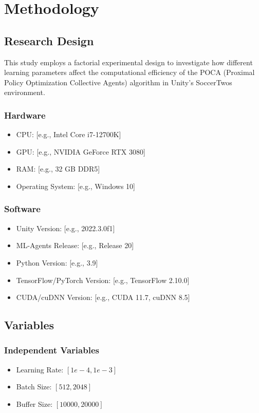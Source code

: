 \section{Methodology}

\subsection{Research Design}
This study employs a factorial experimental design to investigate how different learning parameters affect the computational efficiency of the POCA (Proximal Policy Optimization Collective Agents) algorithm in Unity's SoccerTwos environment.

\subsubsection{Hardware}
\begin{itemize}
    \item CPU: [e.g., Intel Core i7-12700K]
    \item GPU: [e.g., NVIDIA GeForce RTX 3080]
    \item RAM: [e.g., 32 GB DDR5]
    \item Operating System: [e.g., Windows 10]
\end{itemize}

\subsubsection{Software}
\begin{itemize}
    \item Unity Version: [e.g., 2022.3.0f1]
    \item ML-Agents Release: [e.g., Release 20]
    \item Python Version: [e.g., 3.9]
    \item TensorFlow/PyTorch Version: [e.g., TensorFlow 2.10.0]
    \item CUDA/cuDNN Version: [e.g., CUDA 11.7, cuDNN 8.5]
\end{itemize}

\subsection{Variables}
\subsubsection{Independent Variables}
\begin{itemize}
\item Learning Rate: $[1e-4, 1e-3]$
\item Batch Size: $[512, 2048]$
\item Buffer Size: $[10000, 20000]$
\end{itemize}
